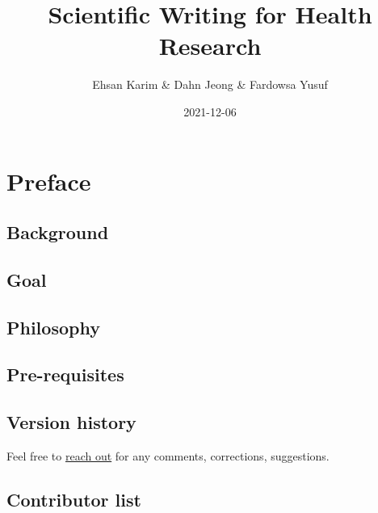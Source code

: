 \documentclass[
]{book}
\title{Scientific Writing for Health Research}
\author{Ehsan Karim \& Dahn Jeong \& Fardowsa Yusuf}
\date{2021-12-06}
\begin{document}
\maketitle

{
\setcounter{tocdepth}{1}
\tableofcontents
}
\newenvironment{blackbox}{
  \definecolor{shadecolor}{rgb}{0, 0, 0}  %
  \color{white}
  \begin{shaded}}
 {\end{shaded}}

\hypertarget{preface}{%
\chapter*{Preface}\label{preface}}

\hypertarget{background}{%
\section*{Background}\label{background}}

\hypertarget{goal}{%
\section*{Goal}\label{goal}}

\hypertarget{philosophy}{%
\section*{Philosophy}\label{philosophy}}

\hypertarget{pre-requisites}{%
\section*{Pre-requisites}\label{pre-requisites}}

\hypertarget{version-history}{%
\section*{Version history}\label{version-history}}

Feel free to \href{https://ehsank.com/}{reach out} for any comments, corrections, suggestions.

\hypertarget{contributor-list}{%
\section*{Contributor list}\label{contributor-list}}
\end{document}
